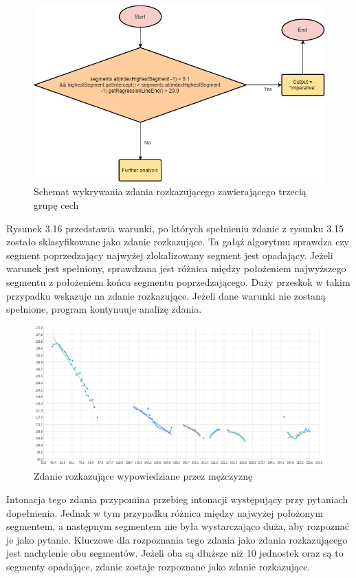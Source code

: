 \documentclass[a4paper,12 pt]{report}
\begin{document}
 \FloatBarrier
\begin{figure}[h]
\centering
\includegraphics[scale=0.85]{Imperative3.png}
\caption{Schemat wykrywania zdania rozkazującego zawierającego trzecią grupę cech}
\end{figure}
\FloatBarrier
Rysunek 3.16 przedstawia warunki, po których spełnieniu zdanie z rysunku 3.15 zostało sklasyfikowane jako zdanie rozkazujące. Ta gałąź algorytmu sprawdza czy segment poprzedzający najwyżej zlokalizowany segment jest opadający. Jeżeli warunek jest spełniony, sprawdzana jest różnica między położeniem najwyższego segmentu z położeniem końca segmentu poprzedzającego. Duży przeskok w takim przypadku wskazuje na zdanie rozkazujące. Jeżeli dane warunki nie zostaną spełnione, program kontynuuje analizę zdania.
 \FloatBarrier
\begin{figure}[h]
\centering
\includegraphics[scale=0.75]{rozkaz_4.pdf}
\caption{Zdanie rozkazujące wypowiedziane przez mężczyznę}
\end{figure}
\FloatBarrier
Intonacja tego zdania przypomina przebieg intonacji występujący przy pytaniach dopełnienia. Jednak w tym przypadku różnica między najwyżej położonym segmentem, a następnym segmentem nie była wystarczająco duża, aby rozpoznać je jako pytanie. Kluczowe dla rozpoznania tego zdania jako zdania rozkazującego jest nachylenie obu segmentów. Jeżeli oba są dłuższe niż 10 jednostek oraz są to segmenty opadające, zdanie zostaje rozpoznane jako zdanie rozkazujące.
\end{document}
